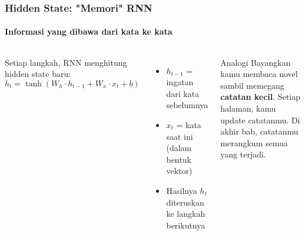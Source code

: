 \documentclass[t,aspectratio=169,xcolor=dvipsnames]{beamer}
\begin{document}
\begin{frame}
    \frametitle{Hidden State: "Memori" RNN}
    \framesubtitle{Informasi yang dibawa dari kata ke kata}
    \small
    \begin{columns}[T]
        Setiap langkah, RNN menghitung hidden state baru:
        \[
            h_t = \tanh(W_h \cdot h_{t-1} + W_x \cdot x_t + b)
        \]
        \footnotesize
        \begin{itemize}
            \item $h_{t-1}$ = ingatan dari kata sebelumnya
            \item $x_t$ = kata saat ini (dalam bentuk vektor)
            \item Hasilnya $h_t$ diteruskan ke langkah berikutnya
        \end{itemize}

        \begin{exampleblock}{Analogi}
            Bayangkan kamu membaca novel sambil memegang \textbf{catatan kecil}. Setiap halaman, kamu update catatanmu. Di akhir bab, catatanmu merangkum semua yang terjadi.
        \end{exampleblock}
    \end{columns}
\end{frame}
\end{document}
